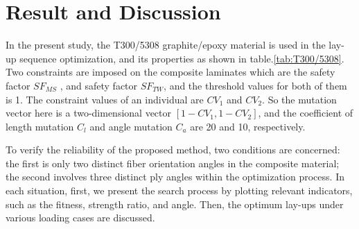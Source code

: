 \section{Result and Discussion}
In the present study, the T300/5308 graphite/epoxy material is used in the
lay-up sequence optimization, and its properties as shown in
table.\ref{tab:T300/5308}. Two constraints are imposed on the composite
laminates which are the safety factor $SF_{MS}$ , and safety factor $SF_{TW}$,
and the threshold values for both of them is 1. The constraint values of an
individual are $CV_1$ and $CV_2$. So the mutation vector here is a two-dimensional
vector $[1 - CV_1, 1 - CV_2 ]$, and the coefficient of length
mutation $C_l$ and angle mutation $C_a$ are  20 and 10, respectively.

To verify the reliability of the proposed method, two conditions are concerned: the
first is only two distinct fiber orientation angles in the composite material;
the second involves three distinct ply angles within the optimization process.
In each situation, first, we present the search process by plotting relevant
indicators, such as the fitness, strength ratio, and angle. Then, the optimum
lay-ups under various loading cases are discussed.

